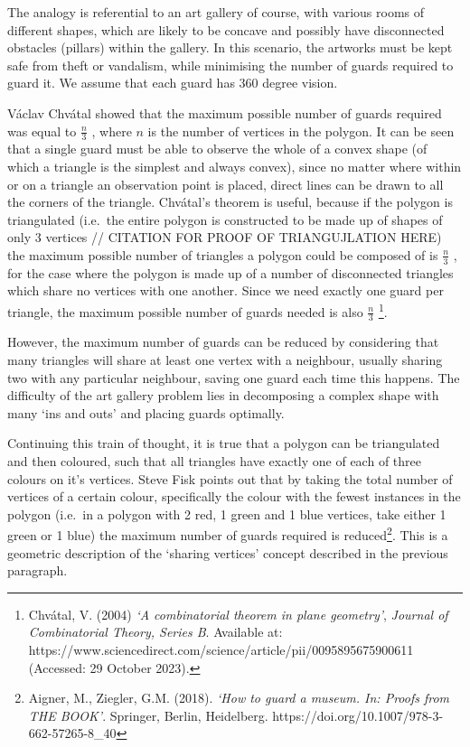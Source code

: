 \documentclass[
]{article}
\begin{document}
The analogy is referential to an art gallery of course, with various
rooms of different shapes, which are likely to be concave and possibly
have disconnected obstacles (pillars) within the gallery. In this
scenario, the artworks must be kept safe from theft or vandalism, while
minimising the number of guards required to guard it. We assume that
each guard has 360 degree vision.

Václav Chvátal showed that the maximum possible number of guards
required was equal to \(\frac{n}{3}\) , where \(n\) is the number of
vertices in the polygon. It can be seen that a single guard must be able
to observe the whole of a convex shape (of which a triangle is the
simplest and always convex), since no matter where within or on a
triangle an observation point is placed, direct lines can be drawn to
all the corners of the triangle. Chvátal's theorem is useful, because if
the polygon is triangulated (i.e.~the entire polygon is constructed to
be made up of shapes of only 3 vertices // CITATION FOR PROOF OF
TRIANGUJLATION HERE) the maximum possible number of triangles a polygon
could be composed of is \(\frac{n}{3}\) , for the case where the polygon
is made up of a number of disconnected triangles which share no vertices
with one another. Since we need exactly one guard per triangle, the
maximum possible number of guards needed is also \(\frac{n}{3}\)
\footnote{Chvátal, V. (2004) \emph{`A combinatorial theorem in plane
  geometry'}, \emph{Journal of Combinatorial Theory, Series B}.
  Available at:
  https://www.sciencedirect.com/science/article/pii/0095895675900611
  (Accessed: 29 October 2023).}.

However, the maximum number of guards can be reduced by considering that
many triangles will share at least one vertex with a neighbour, usually
sharing two with any particular neighbour, saving one guard each time
this happens. The difficulty of the art gallery problem lies in
decomposing a complex shape with many `ins and outs' and placing guards
optimally.

Continuing this train of thought, it is true that a polygon can be
triangulated and then coloured, such that all triangles have exactly one
of each of three colours on it's vertices. Steve Fisk points out that by
taking the total number of vertices of a certain colour, specifically
the colour with the fewest instances in the polygon (i.e.~in a polygon
with 2 red, 1 green and 1 blue vertices, take either 1 green or 1 blue)
the maximum number of guards required is reduced\footnote{Aigner, M.,
  Ziegler, G.M. (2018). \emph{`How to guard a museum. In: Proofs from
  THE BOOK'}. Springer, Berlin, Heidelberg.
  https://doi.org/10.1007/978-3-662-57265-8\_40}. This is a geometric
description of the `sharing vertices' concept described in the previous
paragraph.
\end{document}
